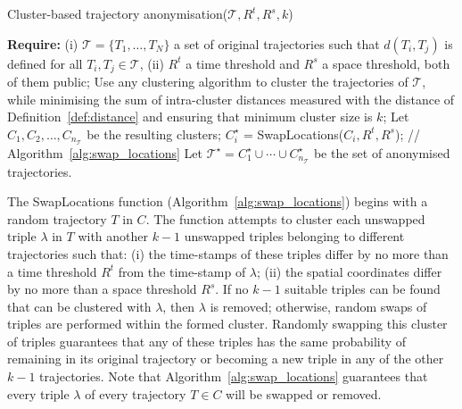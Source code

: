 \begin{algorithm}[!ht]
\caption{Cluster-based trajectory anonymisation($\mathcal{T},R^t, R^s,k$)} \label{alg:clustering}
\begin{algorithmic}[1]
\STATE \textbf{Require:} (i) $\mathcal{T}= \{ T_1, \ldots, T_N\}$ a set of original
trajectories such
that $d(T_i,T_j)$ is defined for all $T_i,T_j \in \mathcal{T}$, (ii) $R^t$ a
time threshold and $R^s$ a space threshold, both of them public;
\STATE Use any clustering algorithm to cluster the trajectories of
$\mathcal{T}$, while minimising the sum of intra-cluster distances measured
with the distance of Definition~\ref{def:distance} and ensuring that
minimum cluster size is $k$;
\STATE Let $C_1, C_2, \dots, C_{n_{\mathcal{T}}}$ be the resulting clusters;
\STATE $C^\star_i$ = SwapLocations($C_i,R^t,R^s$); \hfill // Algorithm~\ref{alg:swap_locations}
\ENDFOR
\STATE Let $\mathcal{T}^\star=C^\star_1 \cup \cdots \cup
C^\star_{n_{\mathcal{T}}}$
be the set of anonymised trajectories.
\end{algorithmic}
\vspace*{1mm}
\end{algorithm}

The SwapLocations function (Algorithm~\ref{alg:swap_locations})
begins with a random trajectory $T$ in $C$.
The function attempts to cluster
each unswapped triple $\lambda$ in $T$
with another $k-1$
unswapped triples belonging to different trajectories
such that: (i) the time-stamps of these triples differ by
no more than a time threshold $R^t$ from the time-stamp of $\lambda$;
(ii) the spatial coordinates differ by
no more than a space threshold $R^s$.
If no $k-1$ suitable
triples can be found that can be clustered with $\lambda$,
then $\lambda$ is removed; otherwise,
random swaps of triples
are performed within the formed cluster.
Randomly swapping this cluster of triples guarantees that any of these triples
has the same probability of remaining in its original trajectory or becoming
a new triple in any of the other $k-1$ trajectories.
Note that Algorithm~\ref{alg:swap_locations} guarantees that every triple $\lambda$ of every trajectory $T \in C$
will be swapped or removed.




